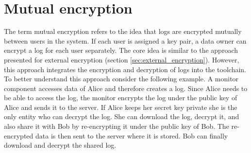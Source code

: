 \documentclass[../main.txt]{subfiles}
\begin{document}
\section{Mutual encryption}
\label{sec:mutual_encryption}
The term mutual encryption refers to the idea that logs are encrypted mutually between users in the system.
If each user is assigned a key pair, a data owner can encrypt a log for each user separately.
The core idea is similar to the approach presented for external encryption (section \ref{sec:external_encryption}).
However, this approach integrates the encryption and decryption of logs into the toolchain.
To better understand this approach consider the following example.
A monitor component accesses data of Alice and therefore creates a log.
Since Alice needs to be able to access the log, the monitor encrypts the log under the public key of Alice and sends it to the server.
If Alice keeps her secret key private she is the only entity who can decrypt the log.
She can download the log, decrypt it, and also share it with Bob by re-encrypting it under the public key of Bob.
The re-encrypted data is then sent to the server where it is stored.
Bob can finally download and decrypt the shared log.
\end{document}

